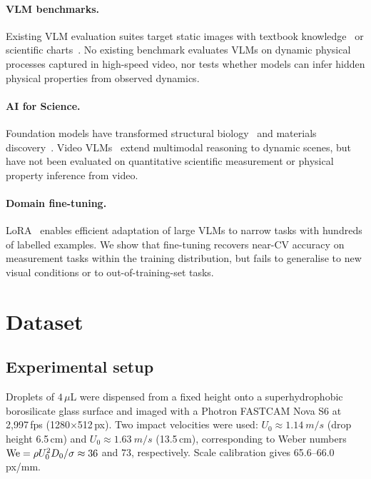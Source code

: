 \documentclass[10pt,twocolumn,letterpaper]{article}
\begin{document}
\paragraph{VLM benchmarks.}
Existing VLM evaluation suites target static images with textbook
knowledge~\cite{mmmu2024,scienceqa2022,mathvista2024} or scientific
charts~\cite{charxiv2024,sciverse2024}. No existing benchmark evaluates
VLMs on dynamic physical processes captured in high-speed video, nor tests
whether models can infer hidden physical properties from observed dynamics.

\paragraph{AI for Science.}
Foundation models have transformed structural biology~\cite{jumper2021alphafold}
and materials discovery~\cite{ai4science2023}. Video
VLMs~\cite{videollava2024,internvl2024} extend multimodal reasoning to dynamic
scenes, but have not been evaluated on quantitative scientific measurement or
physical property inference from video.

\paragraph{Domain fine-tuning.}
LoRA~\cite{lora2022} enables efficient adaptation of large VLMs to narrow tasks
with hundreds of labelled examples. We show that fine-tuning recovers
near-CV accuracy on measurement tasks within the training distribution, but
fails to generalise to new visual conditions or to out-of-training-set tasks.

\section{Dataset}
\label{sec:dataset}

\subsection{Experimental setup}

Droplets of $4\,\mu$L were dispensed from a fixed height onto a
superhydrophobic borosilicate glass surface and imaged with a
Photron FASTCAM Nova S6 at 2{,}997\,fps (1280$\times$512\,px).
Two impact velocities were used: $U_0 \approx \SI{1.14}{m/s}$ (drop height
6.5\,cm) and $U_0 \approx \SI{1.63}{m/s}$ (13.5\,cm), corresponding to Weber
numbers $\mathrm{We} = \rho U_0^2 D_0 / \sigma \approx 36$ and $73$, respectively.
Scale calibration gives 65.6--66.0\,px/mm.
\end{document}
